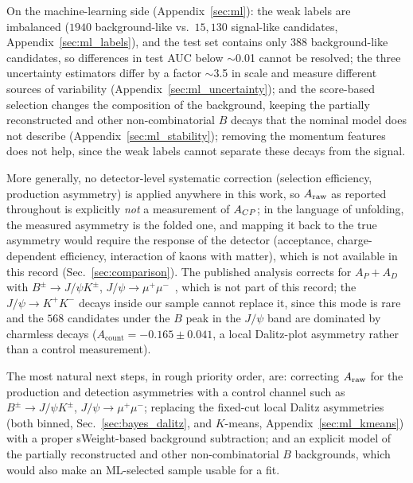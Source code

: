 On the machine-learning side (Appendix~\ref{sec:ml}): the weak labels are imbalanced ($1940$ background-like vs.\ $15{,}130$ signal-like candidates, Appendix~\ref{sec:ml_labels}), and the test set contains only $388$ background-like candidates, so differences in test AUC below $\sim$0.01 cannot be resolved; the three uncertainty estimators differ by a factor $\sim$3.5 in scale and measure different sources of variability (Appendix~\ref{sec:ml_uncertainty}); and the score-based selection changes the composition of the background, keeping the partially reconstructed and other non-combinatorial $B$ decays that the nominal model does not describe (Appendix~\ref{sec:ml_stability}); removing the momentum features does not help, since the weak labels cannot separate these decays from the signal.

More generally, no detector-level systematic correction (selection efficiency, production asymmetry) is applied anywhere in this work, so $A_{\mathrm{raw}}$ as reported throughout is explicitly \emph{not} a measurement of $A_{CP}$; in the language of unfolding, the measured asymmetry is the folded one, and mapping it back to the true asymmetry would require the response of the detector (acceptance, charge-dependent efficiency, interaction of kaons with matter), which is not available in this record (Sec.~\ref{sec:comparison}). The published analysis corrects for $A_P+A_D$ with $B^\pm\to J/\psi K^\pm$, $J/\psi\to\mu^+\mu^-$~\cite{lhcb_cpv_prd2023}, which is not part of this record; the $J/\psi\to K^+K^-$ decays inside our sample cannot replace it, since this mode is rare and the $568$ candidates under the $B$ peak in the $J/\psi$ band are dominated by charmless decays ($A_{\mathrm{count}}=-0.165\pm0.041$, a local Dalitz-plot asymmetry rather than a control measurement).

The most natural next steps, in rough priority order, are: correcting $A_{\mathrm{raw}}$ for the production and detection asymmetries with a control channel such as $B^\pm\to J/\psi K^\pm$, $J/\psi\to\mu^+\mu^-$; replacing the fixed-cut local Dalitz asymmetries (both binned, Sec.~\ref{sec:bayes_dalitz}, and $K$-means, Appendix~\ref{sec:ml_kmeans}) with a proper sWeight-based background subtraction; and an explicit model of the partially reconstructed and other non-combinatorial $B$ backgrounds, which would also make an ML-selected sample usable for a fit.

\FloatBarrier



